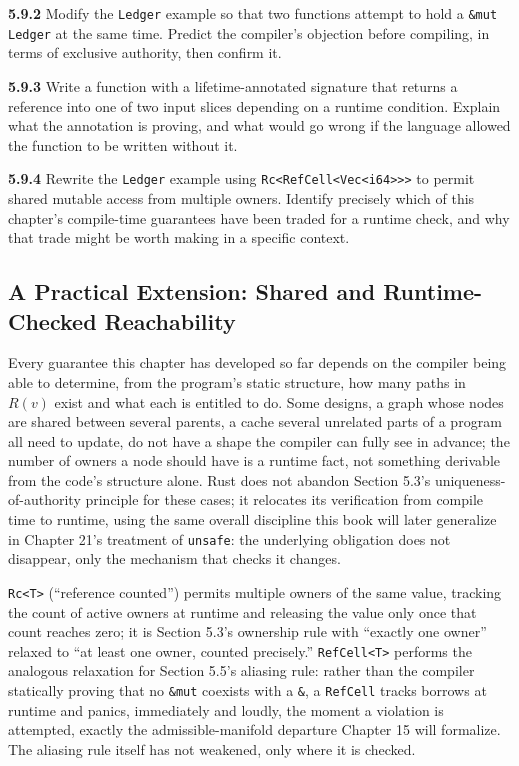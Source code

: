\documentclass[11pt]{book}
\begin{document}
\noindent\textbf{5.9.2} Modify the \texttt{Ledger} example so that two functions attempt to hold a \texttt{\&mut Ledger} at the same time. Predict the compiler's objection before compiling, in terms of exclusive authority, then confirm it.

\noindent\textbf{5.9.3} Write a function with a lifetime-annotated signature that returns a reference into one of two input slices depending on a runtime condition. Explain what the annotation is proving, and what would go wrong if the language allowed the function to be written without it.

\noindent\textbf{5.9.4} Rewrite the \texttt{Ledger} example using \texttt{Rc<RefCell<Vec<i64>>>} to permit shared mutable access from multiple owners. Identify precisely which of this chapter's compile-time guarantees have been traded for a runtime check, and why that trade might be worth making in a specific context.

\subsection*{A Practical Extension: Shared and Runtime-Checked Reachability}

Every guarantee this chapter has developed so far depends on the compiler being able to determine, from the program's static structure, how many paths in $R(v)$ exist and what each is entitled to do. Some designs, a graph whose nodes are shared between several parents, a cache several unrelated parts of a program all need to update, do not have a shape the compiler can fully see in advance; the number of owners a node should have is a runtime fact, not something derivable from the code's structure alone. Rust does not abandon Section 5.3's uniqueness-of-authority principle for these cases; it relocates its verification from compile time to runtime, using the same overall discipline this book will later generalize in Chapter 21's treatment of \texttt{unsafe}: the underlying obligation does not disappear, only the mechanism that checks it changes.

\texttt{Rc<T>} (``reference counted'') permits multiple owners of the same value, tracking the count of active owners at runtime and releasing the value only once that count reaches zero; it is Section 5.3's ownership rule with ``exactly one owner'' relaxed to ``at least one owner, counted precisely.'' \texttt{RefCell<T>} performs the analogous relaxation for Section 5.5's aliasing rule: rather than the compiler statically proving that no \texttt{\&mut} coexists with a \texttt{\&}, a \texttt{RefCell} tracks borrows at runtime and panics, immediately and loudly, the moment a violation is attempted, exactly the admissible-manifold departure Chapter 15 will formalize. The aliasing rule itself has not weakened, only where it is checked.
\end{document}
